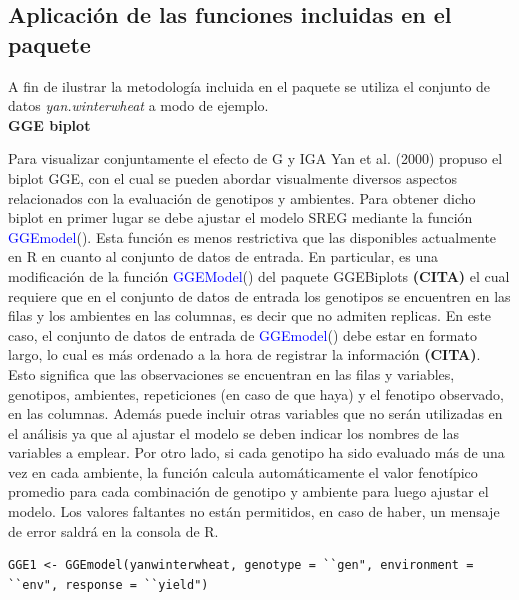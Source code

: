 \subsection{Aplicación de las funciones incluidas en el paquete}

A fin de ilustrar la metodología incluida en el paquete se utiliza el conjunto de datos \emph{yan.winterwheat} a modo de ejemplo.\\


\textbf{GGE biplot}

Para visualizar conjuntamente el efecto de G y IGA Yan et al. (2000) propuso el biplot GGE, con el cual se pueden abordar visualmente diversos aspectos relacionados con la evaluación de genotipos y ambientes. Para obtener dicho biplot en primer lugar se debe ajustar el modelo SREG mediante la función \textcolor{blue}{GGEmodel}(). Esta función es menos restrictiva que las disponibles actualmente en R en cuanto al conjunto de datos de entrada. En particular, es una modificación de la  función \textcolor{blue}{GGEModel}() del paquete GGEBiplots \textbf{(CITA)} el cual requiere que en el conjunto de datos de entrada los genotipos se encuentren en las filas y los ambientes en las columnas, es decir que no admiten replicas. En este caso, el conjunto de datos de entrada de \textcolor{blue}{GGEmodel}() debe estar en formato largo, lo cual es más ordenado a la hora de registrar la información \textbf{(CITA)}. Esto significa que las observaciones se encuentran en las filas y variables, genotipos, ambientes, repeticiones (en caso de que haya) y el fenotipo observado, en las columnas. Además puede incluir otras variables que no serán utilizadas en el análisis ya que al ajustar el modelo se deben indicar los nombres de las variables a emplear. Por otro lado, si cada genotipo ha sido evaluado más de una vez en cada ambiente, la función calcula automáticamente el valor fenotípico promedio para cada combinación de genotipo y ambiente para luego ajustar el modelo. Los valores faltantes no están permitidos, en caso de haber, un mensaje de error saldrá en la consola de R.\\  
\begin{tcolorbox}[colframe=aurometalsaurus,colback=backcolour,colbacklower=white,
   				width=1\linewidth,
    			height=0.1\linewidth,
    			boxsep=-3mm]
\begin{lstlisting}
GGE1 <- GGEmodel(yanwinterwheat, genotype = ``gen", environment = ``env", response = ``yield")
\end{lstlisting}
\end{tcolorbox}
